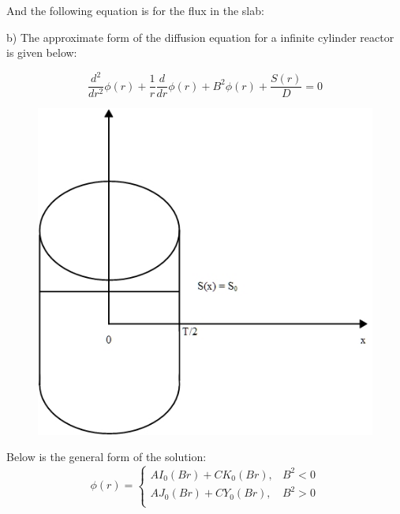 \documentclass{amsart}
\theoremstyle{definition}
\newcommand*\widefbox[1]{\fbox{\hspace{2em}#1\hspace{2em}}}
\begin{document}
And the following equation is for the flux in the slab:



\bigbreak
b) The approximate form of the diffusion equation for a infinite cylinder reactor is given below:
\bigbreak

\begin{equation*}
    \frac{d^2}{dr^2}\phi(r) + \frac{1}{r}\frac{d}{dr}\phi(r) +B^2\phi(r) + \frac{S(r)}{D} = 0
\end{equation*}

\begin{figure}[h!]
    \includegraphics[width=.45\linewidth]{P1b}
\end{figure}
\bigbreak


Below is the general form of the solution:
\bigbreak
\[   \phi(r) = \left\{
\begin{array}{ll}
      AI_0(Br) + CK_0(Br), &  B^2 < 0\\
      AJ_0(Br) + CY_0(Br), &  B^2 > 0\\
\end{array}
\right. \]
\bigbreak
\end{document}
